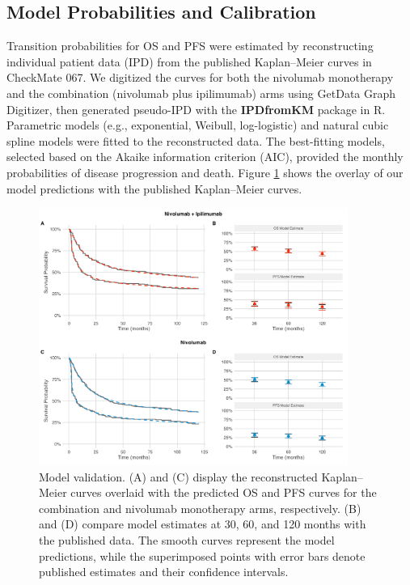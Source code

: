 \documentclass[preprint, 3p,
authoryear]{elsarticle} %
\begin{document}
\subsection{Model Probabilities and
Calibration}\label{model-probabilities-and-calibration}

Transition probabilities for OS and PFS were estimated by reconstructing
individual patient data (IPD) from the published Kaplan--Meier curves in
CheckMate 067. We digitized the curves for both the nivolumab
monotherapy and the combination (nivolumab plus ipilimumab) arms using
GetData Graph Digitizer, then generated pseudo-IPD with the
\textbf{IPDfromKM} package in R. Parametric models (e.g., exponential,
Weibull, log-logistic) and natural cubic spline models were fitted to
the reconstructed data. The best-fitting models, selected based on the
Akaike information criterion (AIC), provided the monthly probabilities
of disease progression and death. Figure
\hyperref[fig:validation]{\ref{fig:validation}} shows the overlay of our
model predictions with the published Kaplan--Meier curves.

\begin{figure}[h]
\centering
\includegraphics[width=0.9\textwidth]{../outputs/survival_curves.png}
\caption{Model validation. (A) and (C) display the reconstructed Kaplan–Meier curves overlaid with the predicted OS and PFS curves for the combination and nivolumab monotherapy arms, respectively. (B) and (D) compare model estimates at 30, 60, and 120 months with the published data. The smooth curves represent the model predictions, while the superimposed points with error bars denote published estimates and their confidence intervals.}
\label{fig:validation}
\end{figure}
\end{document}
